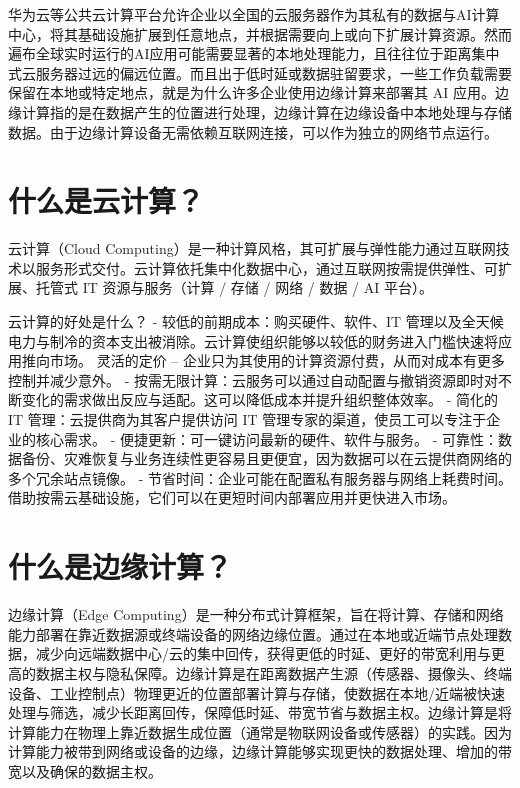 华为云等公共云计算平台允许企业以全国的云服务器作为其私有的数据与AI计算中心，将其基础设施扩展到任意地点，并根据需要向上或向下扩展计算资源。然而遍布全球实时运行的AI应用可能需要显著的本地处理能力，且往往位于距离集中式云服务器过远的偏远位置。而且出于低时延或数据驻留要求，一些工作负载需要保留在本地或特定地点，就是为什么许多企业使用边缘计算来部署其
AI
应用。边缘计算指的是在数据产生的位置进行处理，边缘计算在边缘设备中本地处理与存储数据。由于边缘计算设备无需依赖互联网连接，可以作为独立的网络节点运行。

\section{什么是云计算？}\label{ux4ec0ux4e48ux662fux4e91ux8ba1ux7b97}

云计算（Cloud
Computing）是一种计算风格，其可扩展与弹性能力通过互联网技术以服务形式交付。云计算依托集中化数据中心，通过互联网按需提供弹性、可扩展、托管式
IT 资源与服务（计算 / 存储 / 网络 / 数据 / AI 平台）。

云计算的好处是什么？ - 较低的前期成本：购买硬件、软件、IT
管理以及全天候电力与制冷的资本支出被消除。云计算使组织能够以较低的财务进入门槛快速将应用推向市场。
灵活的定价 --
企业只为其使用的计算资源付费，从而对成本有更多控制并减少意外。 -
按需无限计算：云服务可以通过自动配置与撤销资源即时对不断变化的需求做出反应与适配。这可以降低成本并提升组织整体效率。
- 简化的 IT 管理：云提供商为其客户提供访问 IT
管理专家的渠道，使员工可以专注于企业的核心需求。 -
便捷更新：可一键访问最新的硬件、软件与服务。 -
可靠性：数据备份、灾难恢复与业务连续性更容易且更便宜，因为数据可以在云提供商网络的多个冗余站点镜像。
-
节省时间：企业可能在配置私有服务器与网络上耗费时间。借助按需云基础设施，它们可以在更短时间内部署应用并更快进入市场。

\section{什么是边缘计算？}\label{ux4ec0ux4e48ux662fux8fb9ux7f18ux8ba1ux7b97}

边缘计算（Edge
Computing）是一种分布式计算框架，旨在将计算、存储和网络能力部署在靠近数据源或终端设备的网络边缘位置。通过在本地或近端节点处理数据，减少向远端数据中心/云的集中回传，获得更低的时延、更好的带宽利用与更高的数据主权与隐私保障。边缘计算是在距离数据产生源（传感器、摄像头、终端设备、工业控制点）物理更近的位置部署计算与存储，使数据在本地/近端被快速处理与筛选，减少长距离回传，保障低时延、带宽节省与数据主权。边缘计算是将计算能力在物理上靠近数据生成位置（通常是物联网设备或传感器）的实践。因为计算能力被带到网络或设备的边缘，边缘计算能够实现更快的数据处理、增加的带宽以及确保的数据主权。

